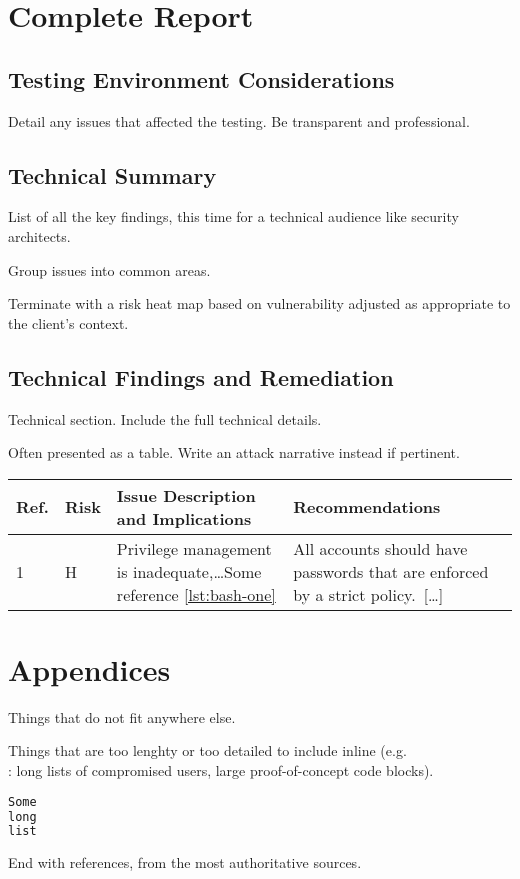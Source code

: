 \documentclass[a4paper, 12pt]{report}
\begin{document}
\chapter{Complete Report}
\section{Testing Environment Considerations}

Detail any issues that affected the testing. Be transparent and professional.

\section{Technical Summary}
List of all the key findings, this time for a technical audience like
security architects.

Group issues into common areas.

Terminate with a risk heat map based on vulnerability adjusted as appropriate
to the client's context. 

\section{Technical Findings and Remediation}
Technical section. Include the full technical details.

Often presented as a table. Write an attack narrative instead if pertinent.

\begin{tabular}{llp{}p{}}
	\toprule
	Ref. & Risk & Issue Description and Implications & Recommendations \\
	\midrule
	1 & H & Privilege management is inadequate,\ldots Some reference \ref{lst:bash-one} & All accounts should have passwords that are enforced by a strict policy.~[\ldots] \\
	\bottomrule
\end{tabular}

\chapter{Appendices}
Things that do not fit anywhere else.

Things that are too lenghty or too detailed to include inline (e.g.\\: long lists of compromised users, large proof-of-concept code blocks).

\label{listing:bash1}
\begin{lstlisting}[caption=Some long listing.,language=sh, label=lst:bash-one]
Some
long
list
\end{lstlisting}

End with references, from the most authoritative sources.
\end{document}
